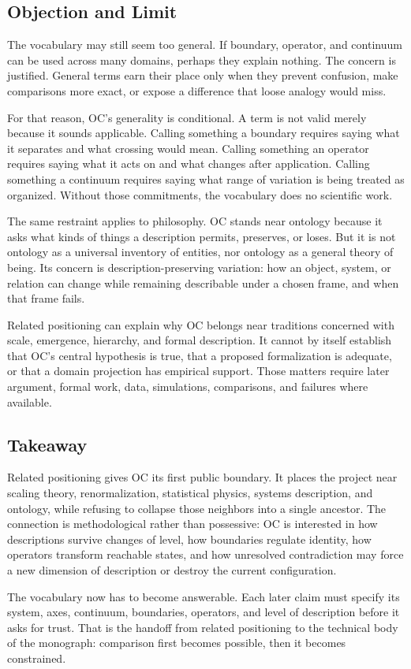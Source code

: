 \documentclass[11pt,a4paper,openany]{book}
\begin{document}
\subsection{Objection and Limit}
The vocabulary may still seem too general. If boundary, operator, and continuum can be used across many domains, perhaps they explain nothing. The concern is justified. General terms earn their place only when they prevent confusion, make comparisons more exact, or expose a difference that loose analogy would miss. \cite{goldenfeld_lectures,kadanoff_scaling}\par
For that reason, OC's generality is conditional. A term is not valid merely because it sounds applicable. Calling something a boundary requires saying what it separates and what crossing would mean. Calling something an operator requires saying what it acts on and what changes after application. Calling something a continuum requires saying what range of variation is being treated as organized. Without those commitments, the vocabulary does no scientific work.\par
The same restraint applies to philosophy. OC stands near ontology because it asks what kinds of things a description permits, preserves, or loses. But it is not ontology as a universal inventory of entities, nor ontology as a general theory of being. Its concern is description-preserving variation: how an object, system, or relation can change while remaining describable under a chosen frame, and when that frame fails.\par
Related positioning can explain why OC belongs near traditions concerned with scale, emergence, hierarchy, and formal description. It cannot by itself establish that OC's central hypothesis is true, that a proposed formalization is adequate, or that a domain projection has empirical support. Those matters require later argument, formal work, data, simulations, comparisons, and failures where available.\par
\subsection{Takeaway}
Related positioning gives OC its first public boundary. It places the project near scaling theory, renormalization, statistical physics, systems description, and ontology, while refusing to collapse those neighbors into a single ancestor. The connection is methodological rather than possessive: OC is interested in how descriptions survive changes of level, how boundaries regulate identity, how operators transform reachable states, and how unresolved contradiction may force a new dimension of description or destroy the current configuration. \cite{goldenfeld_lectures,kadanoff_scaling}\par
The vocabulary now has to become answerable. Each later claim must specify its system, axes, continuum, boundaries, operators, and level of description before it asks for trust. That is the handoff from related positioning to the technical body of the monograph: comparison first becomes possible, then it becomes constrained.\par
\end{document}
